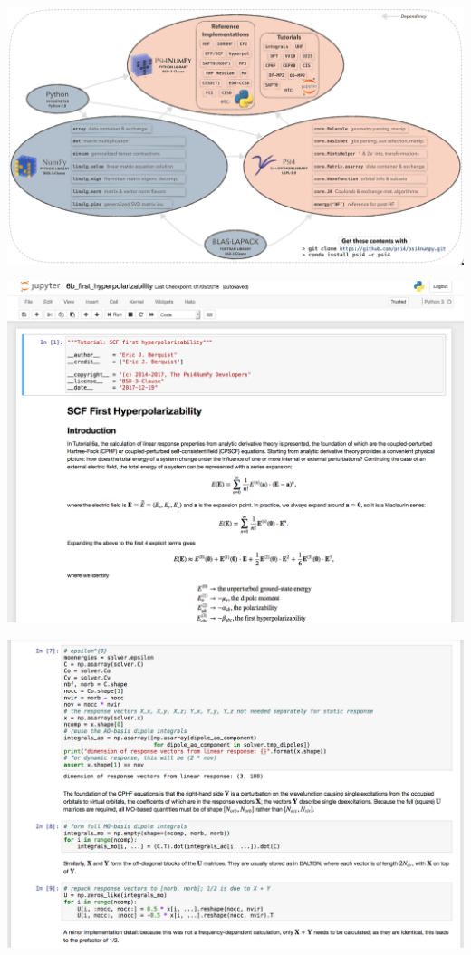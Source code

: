\documentclass[xcolor=usenames,dvipsnames,svgnames]{beamer}
\begin{document}
\begin{frame}
  \centering
  \includegraphics[width=\linewidth,keepaspectratio]{../paper_05/fig1-oval-org.pdf}
\end{frame}

\begin{frame}
  \centering
  \includegraphics[width=\linewidth,keepaspectratio]{./figures/psi4numpy_notebook_1.png}
\end{frame}

\begin{frame}
  \centering
  \includegraphics[width=\linewidth,keepaspectratio]{./figures/psi4numpy_notebook_2.png}
\end{frame}
\end{document}
